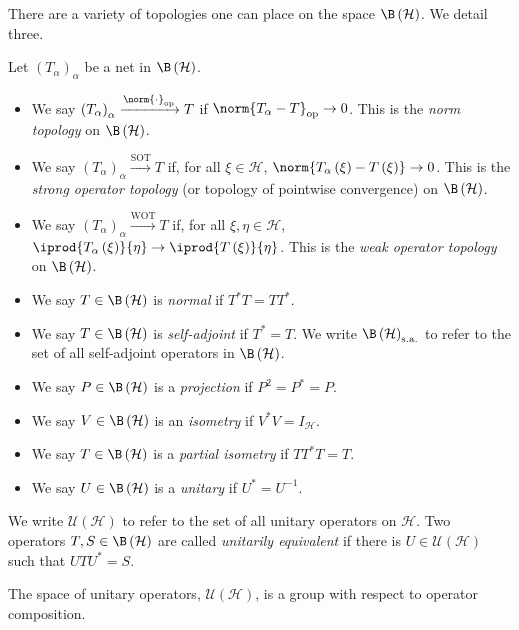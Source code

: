 There are a variety of topologies one can place on the space $\B\left(\mathcal{H}\right)$. We detail three.
\begin{definition}
  Let $\left(T_{\alpha}\right)_{\alpha}$ be a net in $\B\left(\mathcal{H}\right)$.
  \begin{itemize}
    \item We say $\left(T_{\alpha}\right)_{\alpha}\xrightarrow{\norm{\cdot}_{\op}} T$ if $\norm{T_{\alpha} - T}_{\op}\rightarrow 0$. This is the \textit{norm topology} on $\B\left(\mathcal{H}\right)$.
    \item We say $\left(T_{\alpha}\right)_{\alpha}\xrightarrow{ \text{SOT} } T$ if, for all $\xi\in \mathcal{H}$, $\norm{T_{\alpha}\left(\xi\right) - T\left(\xi\right)}\rightarrow 0$. This is the \textit{strong operator topology} (or topology of pointwise convergence) on $\B\left(\mathcal{H}\right)$.
    \item We say $\left(T_{\alpha}\right)_{\alpha}\xrightarrow{\text{WOT}}T$ if, for all $\xi,\eta\in \mathcal{H}$, $ \iprod{T_{\alpha}\left(\xi\right)}{\eta}\rightarrow \iprod{T\left(\xi\right)}{\eta} $. This is the \textit{weak operator topology} on $\B\left(\mathcal{H}\right)$.
  \end{itemize}
\end{definition}
\begin{definition}\label{def:distinguished_operators}\hfill
  \begin{itemize}
    \item We say $T\in \B\left(\mathcal{H}\right)$ is \textit{normal} if $T^{\ast}T = TT^{\ast}$.
    \item We say $T\in \B\left(\mathcal{H}\right)$ is \textit{self-adjoint} if $T^{\ast}= T$. We write $\B\left(\mathcal{H}\right)_{\sa}$ to refer to the set of all self-adjoint operators in $\B\left(\mathcal{H}\right)$.
    \item We say $P\in \B\left(\mathcal{H}\right)$ is a \textit{projection} if $P^2 = P^{\ast} = P$.
    \item We say $V\in \B\left(\mathcal{H}\right)$ is an \textit{isometry} if $V^{\ast}V = I_{\mathcal{H}}$.
    \item We say $T\in \B\left(\mathcal{H}\right)$ is a \textit{partial isometry} if $TT^{\ast}T = T$.
    \item We say $U\in \B\left(\mathcal{H}\right)$ is a \textit{unitary} if $U^{\ast} = U^{-1}$.
  \end{itemize}
  We write $\mathcal{U}\left(\mathcal{H}\right)$ to refer to the set of all unitary operators on $\mathcal{H}$. Two operators $T,S\in \B\left(\mathcal{H}\right)$ are called \textit{unitarily equivalent} if there is $U\in \mathcal{U}\left(\mathcal{H}\right)$ such that $UTU^{\ast} = S$.\newline

  The space of unitary operators, $\mathcal{U}\left(\mathcal{H}\right)$, is a group with respect to operator composition.
\end{definition}
